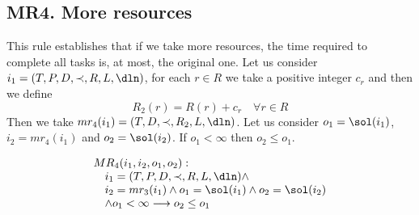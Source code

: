 











\subsection{MR4. More resources}
This rule establishes that if we take more resources, the
time required to complete all tasks is, at most, the original one.
Let us consider
$i_{1}=(T, P, D, \prec, R, L, \dln)$, for each $r\in R$ we take a
positive integer $c_{r}$ and then we define
\begin{displaymath}
  R_{2}(r)=R(r)+c_{r}\quad \forall r\in R
\end{displaymath}
Then we take $mr_{4}(i_{1}) = (T, D, \prec, R_{2}, L, \dln)$.
Let us
consider $o_{1}=\sol(i_{1})$, $i_{2}=mr_{4}(i_{1})$ and
$o_{2}=\sol(i_{2})$.
If $o_{1}<\infty$ then $o_{2}\leq o_{1}$.

\begin{framed}
  \begin{displaymath}
      \begin{array}{l}
    MR_{4}(i_1,i_2,o_{1},o_{2}):\\
      \hskip 1em  i_1=(T,P,D,\prec,R,L,\dln) \wedge\\
      \hskip 1em  i_2=mr_3(i_1)\wedge o_{1}=\sol(i_{1})\wedge o_{2}=\sol(i_2)\\
      \hskip 1em \wedge o_{1}<\infty
      \longrightarrow o_{2}\leq o_1
    \end{array}
  \end{displaymath}
\end{framed}


